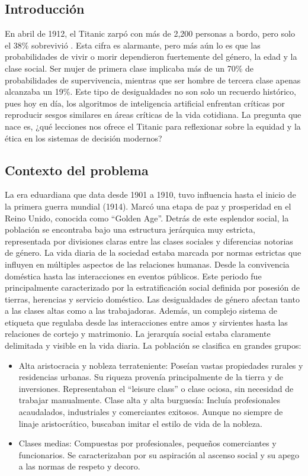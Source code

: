 \documentclass[sjournal]{IEEEtran}
\begin{document}
\subsection{Introducción}
En abril de 1912, el Titanic zarpó con más de 2,200 personas a bordo, pero solo el 38\% sobrevivió . Esta cifra es alarmante, pero más aún lo es que las probabilidades de vivir o morir dependieron fuertemente del género, la edad y la clase social. Ser mujer de primera clase implicaba más de un 70\% de probabilidades de supervivencia, mientras que ser hombre de tercera clase apenas alcanzaba un 19\%. Este tipo de desigualdades no son solo un recuerdo histórico, pues hoy en día, los algoritmos de inteligencia artificial enfrentan críticas por reproducir sesgos similares en áreas críticas de la vida cotidiana. La pregunta que nace es, ¿qué lecciones nos ofrece el Titanic para reflexionar sobre la equidad y la ética en los sistemas de decisión modernos?


 

\subsection{Contexto del problema}
La era eduardiana que data desde 1901 a 1910, tuvo influencia hasta el inicio de la primera guerra mundial (1914). Marcó una etapa de paz y prosperidad en el Reino Unido, conocida como “Golden Age”. Detrás de este esplendor social, la población se encontraba bajo una estructura jerárquica muy estricta, representada por divisiones claras entre las clases sociales y diferencias notorias de género. La vida diaria de la sociedad estaba marcada por normas estrictas que influyen en múltiples aspectos de las relaciones humanas. Desde la convivencia doméstica hasta las interacciones en eventos públicos. Este periodo fue principalmente caracterizado por la estratificación social definida por posesión de tierras, herencias y servicio doméstico. Las desigualdades de género afectan tanto a las clases altas como a las trabajadoras. Además, un complejo sistema de etiqueta que regulaba desde las interacciones entre amos y sirvientes hasta las relaciones de cortejo y matrimonio. La jerarquía social estaba claramente delimitada y visible en la vida diaria. La población se clasifica en grandes grupos:

\begin{itemize}
    \item Alta aristocracia y nobleza terrateniente: Poseían vastas propiedades rurales y residencias urbanas. Su riqueza provenía principalmente de la tierra y de inversiones. Representaban el “leisure class” o clase ociosa, sin necesidad de trabajar manualmente.
Clase alta y alta burguesía: Incluía profesionales acaudalados, industriales y comerciantes exitosos. Aunque no siempre de linaje aristocrático, buscaban imitar el estilo de vida de la nobleza.
    \item Clases medias: Compuestas por profesionales, pequeños comerciantes y funcionarios. Se caracterizaban por su aspiración al ascenso social y su apego a las normas de respeto y decoro.
\end{itemize}
\end{document}
